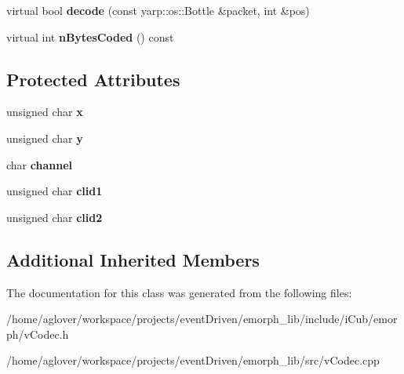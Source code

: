 \begin{DoxyCompactItemize}
\item 
\hypertarget{classemorph_1_1CollisionEvent_acf7bde166ff6c125b8df85a25b027282}{virtual bool {\bfseries decode} (const yarp\-::os\-::\-Bottle \&packet, int \&pos)}\label{classemorph_1_1CollisionEvent_acf7bde166ff6c125b8df85a25b027282}

\item 
\hypertarget{classemorph_1_1CollisionEvent_a442efa9c52a54074ab843edc9b8bbb57}{virtual int {\bfseries n\-Bytes\-Coded} () const }\label{classemorph_1_1CollisionEvent_a442efa9c52a54074ab843edc9b8bbb57}

\end{DoxyCompactItemize}
\subsection*{Protected Attributes}
\begin{DoxyCompactItemize}
\item 
\hypertarget{classemorph_1_1CollisionEvent_a67f17bca7d5c16526a87cbb7a7962498}{unsigned char {\bfseries x}}\label{classemorph_1_1CollisionEvent_a67f17bca7d5c16526a87cbb7a7962498}

\item 
\hypertarget{classemorph_1_1CollisionEvent_aa586cf783684799338ab52ff4414dff6}{unsigned char {\bfseries y}}\label{classemorph_1_1CollisionEvent_aa586cf783684799338ab52ff4414dff6}

\item 
\hypertarget{classemorph_1_1CollisionEvent_a1d469ac4d1a0d4c403eea66ce10789d2}{char {\bfseries channel}}\label{classemorph_1_1CollisionEvent_a1d469ac4d1a0d4c403eea66ce10789d2}

\item 
\hypertarget{classemorph_1_1CollisionEvent_a35a3cbb65dfc24190c0bc7bd9d4dad89}{unsigned char {\bfseries clid1}}\label{classemorph_1_1CollisionEvent_a35a3cbb65dfc24190c0bc7bd9d4dad89}

\item 
\hypertarget{classemorph_1_1CollisionEvent_a4742ecacfb76e1f5be614d6c8c7a102b}{unsigned char {\bfseries clid2}}\label{classemorph_1_1CollisionEvent_a4742ecacfb76e1f5be614d6c8c7a102b}

\end{DoxyCompactItemize}
\subsection*{Additional Inherited Members}


The documentation for this class was generated from the following files\-:\begin{DoxyCompactItemize}
\item 
/home/aglover/workspace/projects/event\-Driven/emorph\-\_\-lib/include/i\-Cub/emorph/v\-Codec.\-h\item 
/home/aglover/workspace/projects/event\-Driven/emorph\-\_\-lib/src/v\-Codec.\-cpp\end{DoxyCompactItemize}
